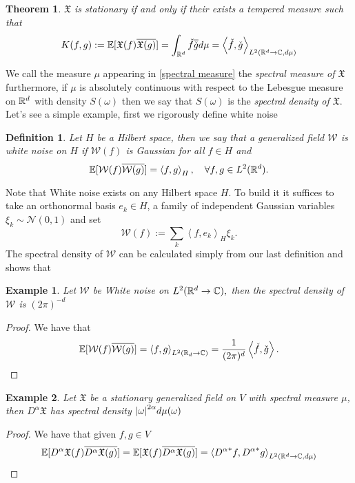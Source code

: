 \documentclass[12pt]{article}
\newtheorem{theorem}{Theorem}
\newtheorem{definition}{Definition}
\newtheorem{example}{Example}
\newcommand{\Ww}{\mathcal{W}}\newcommand{\Aa}{\mathcal{A}}\newcommand{\Bb}{\mathcal{B}}\newcommand{\Cc}{\mathcal{C}}\newcommand{\Ee}{\mathcal{E}}\newcommand{\Ff}{\mathcal{F}}\newcommand{\Gg}{\mathcal{G}}\newcommand{\Hh}{\mathcal{H}}\newcommand{\Kk}{\mathcal{K}}\newcommand{\Ll}{\mathcal{L}}\newcommand{\Mm}{\mathcal{M}}\newcommand{\Nn}{\mathcal{N}}\newcommand{\Pp}{\mathcal{P}}\newcommand{\Qq}{\mathcal{Q}}\newcommand{\Rr}{{\mathcal R}}\newcommand{\Ss}zzzzz\newcommand{\Tt}{{\mathcal T}}\newcommand{\Zz}{{\mathcal Z}}\newcommand{\Uu}{{\mathcal U}}
\newcommand{\W}{{\mathcal W}}
\newcommand{\br}[1]{\left\langle#1\right\rangle}
\begin{document}
\begin{CJK*}{UTF8}{gbsn}
\begin{theorem}
		$\mathfrak{X} $ is stationary if and only if their exists a tempered measure such that
		\begin{equation}\label{spectral measure}
			K(f,g):=\E[\mathfrak{X} (f)\overline{\mathfrak{X} (g)}]=\int_{\R^d}\check{f}\overline{\check{g}}d \mu=\br{\check{f},\check{g}}_{L^2(\R^d\to\C,d\mu )}
		\end{equation}
	\end{theorem}
	We call the measure $\mu $ appearing in \eqref{spectral measure} the \emph{spectral measure of $\mathfrak{X}$} furthermore, if $\mu $ is absolutely continuous with respect to the Lebesgue measure on ${\mathbb R}^d$
	with density $S(\omega)$ then we say that $S(\omega)$ is the \emph{spectral density of $\mathfrak{X}$}. Let's see a simple example, first we rigorously define white noise
	\begin{definition}
		Let $H$ be a Hilbert space, then we say that a generalized field  $\Ww$ is \emph{white noise on $H$} if  $\W(f)$ is Gaussian for all $f \in H$ and
		\begin{equation*}
			\E[\W(f)\overline{\W(g)}]=\br{f,g}_{H}, \quad\forall f,g \in L^2(\R^d).
		\end{equation*}
	\end{definition}
	Note that White noise exists on any Hilbert space $H$. To build it it suffices to take an orthonormal basis  $e_k \in H$, a family of independent Gaussian variables $\xi _k \sim \Nn(0,1)$ and set
	\begin{equation*}
		\W(f):=\sum_{k}\br{f,e_k}_H \xi _k .
	\end{equation*}
	The spectral density of $\Ww$ can be calculated simply from our last definition and shows that
	\begin{example}
		Let $\Ww$ be White noise on $L^2({\mathbb R}^d\to\mathbb{C}),$ then the spectral density of $\Ww$ is $(2\pi )^{-d}$
	\end{example}
	\begin{proof}
		We have that
		\begin{equation*}
			\E[\Ww(f)\overline{\Ww(g)}]=\br{f,g}_{L^2(\R_d\to\C)}=\frac{1}{(2\pi )^d}\br{\check{f},\check{g}}.
		\end{equation*}
	\end{proof}
	\begin{example}
		Let $\mathfrak{X}$ be a stationary generalized field on $V$ with spectral measure $\mu $, then $D^\alpha \mathfrak{X}$ has spectral density $\abs{\omega}^{2\alpha}d\mu(\omega) $
	\end{example}
	\begin{proof}
		We have that given $f,g \in V$
		\begin{equation*}
			\E[D^\alpha\mathfrak{X}(f)\overline{D^\alpha\mathfrak{X}(g)}]=\E[\mathfrak{X}(f)\overline{D^\alpha\mathfrak{X}(g)}]=\br{{D^\alpha}^*f,{D^\alpha}^*g}_{L^2(\R^d\to\C,d\mu )}
		\end{equation*}


\end{proof}
\end{CJK*}
\end{document}
